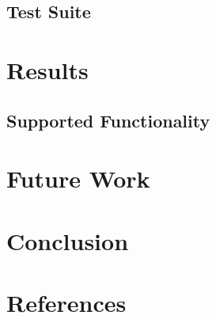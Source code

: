 \documentclass[10pt,a4paper]{article}
\begin{document}
\subsection{Test Suite}

\section{Results}
\subsection{Supported Functionality}


\section{Future Work}

\section{Conclusion}

\section{References} %
\end{document}
